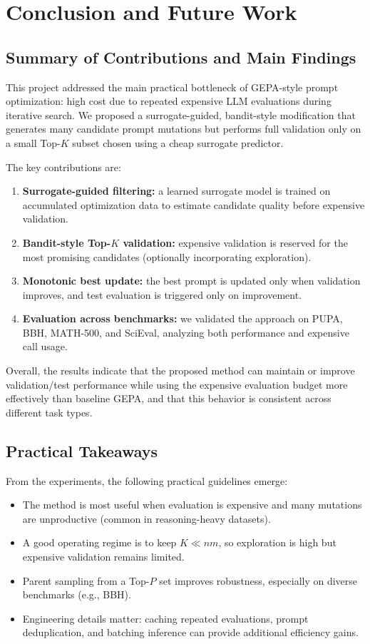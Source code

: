 \chapter{Conclusion and Future Work}
\label{ch:conclusion}

\section{Summary of Contributions and Main Findings}
This project addressed the main practical bottleneck of GEPA-style prompt optimization: high cost due to repeated expensive LLM evaluations during iterative search. We proposed a surrogate-guided, bandit-style modification that generates many candidate prompt mutations but performs full validation only on a small Top-$K$ subset chosen using a cheap surrogate predictor.

The key contributions are:
\begin{enumerate}
    \item \textbf{Surrogate-guided filtering:} a learned surrogate model is trained on accumulated optimization data to estimate candidate quality before expensive validation.
    \item \textbf{Bandit-style Top-$K$ validation:} expensive validation is reserved for the most promising candidates (optionally incorporating exploration).
    \item \textbf{Monotonic best update:} the best prompt is updated only when validation improves, and test evaluation is triggered only on improvement.
    \item \textbf{Evaluation across benchmarks:} we validated the approach on PUPA, BBH, MATH-500, and SciEval, analyzing both performance and expensive call usage.
\end{enumerate}

Overall, the results indicate that the proposed method can maintain or improve validation/test performance while using the expensive evaluation budget more effectively than baseline GEPA, and that this behavior is consistent across different task types.

\section{Practical Takeaways}
From the experiments, the following practical guidelines emerge:
\begin{itemize}
    \item The method is most useful when evaluation is expensive and many mutations are unproductive (common in reasoning-heavy datasets).
    \item A good operating regime is to keep $K \ll n m$, so exploration is high but expensive validation remains limited.
    \item Parent sampling from a Top-$P$ set improves robustness, especially on diverse benchmarks (e.g., BBH).
    \item Engineering details matter: caching repeated evaluations, prompt deduplication, and batching inference can provide additional efficiency gains.
\end{itemize}

